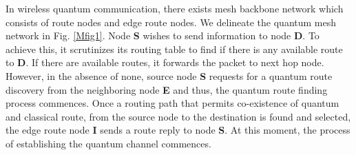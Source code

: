 \documentclass[aps,pra,twocolumn,showpacs,superscriptaddress,groupedaddress]{revtex4}
\begin{document}
In wireless quantum communication, there exists mesh backbone network which consists of route nodes and edge route nodes. We delineate the quantum mesh network in Fig. \ref{Mfig1}. Node {\bf S} wishes to send information to node {\bf D}. To achieve this, it scrutinizes its routing table to find if there is any available route to {\bf D}. If there are available routes, it forwards the packet to next hop node. However, in the absence of none, source node {\bf S} requests for a quantum route discovery from the neighboring node {\bf E} and thus, the quantum route finding process commences. Once a routing path that permits co-existence of quantum and classical route, from the source node to the destination is found and selected, the edge route node {\bf I} sends a route reply to node {\bf S}. At this moment, the process of establishing the quantum channel commences.
\end{document}
